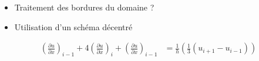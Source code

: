 \documentclass{beamer}
\begin{document}
\begin{frame}
  \begin{itemize}
  \item   Traitement des bordures du domaine ?
  \item   Utilisation d'un schéma décentré
  \end{itemize}

 
  \footnotesize
    \begin{subequations}
    \begin{align*}
    \left( \frac{\partial u}{\partial x}\right) _{i-1} + 4 \left( \frac{\partial u}{\partial x}\right) _{i}  +  \left( \frac{\partial u}{\partial x}\right) _{i-1} &= \frac{1}{h}\left( \frac{1}{3} \left( u_{i+1} - u_{i-1} \right) \right)
    \end{align*}
  \end{subequations}
  
\end{frame}




%
\end{document}

